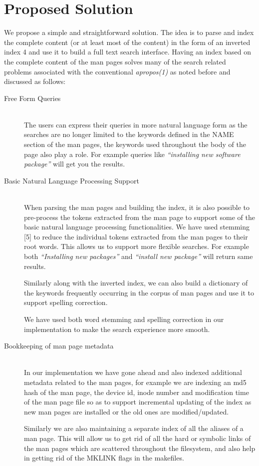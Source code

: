 \documentclass[titlepage, a4paper, 12pt]{article}
\begin{document}
\section{Proposed Solution}
We propose a simple and straightforward solution. The idea is to parse and index
the complete content (or at least most of the content) in the form of an
inverted index {4} and use it to build a full text search
interface. Having an index based on the complete content of the man pages solves
many of the search
related problems associated with the conventional \textit{apropos(1)} as noted
before and discussed as follows:
\begin{description}
\item[Free Form Queries] \hfill \\
The users can express their queries in more natural language form as the searches
are no longer limited to the keywords defined in the NAME section of the man
pages, the keywords used throughout the body of the page also play a role.
For example queries like \textit{``installing new software package''}
will get you the results.
\end{description}
\begin{description}
\item[Basic Natural Language Processing Support] \hfill \\
When parsing the man pages and building the index, it is also possible to
pre-process the tokens extracted from the man page to support some of the
basic natural language processing functionalities. We have used stemming [5] to
reduce the individual tokens extracted from the man pages to their root words.
This allows us to support more flexible searches. For example both
\textit{``Installing new packages''} and \textit{``install new package''} will
return same results.

Similarly along with the inverted index, we can also build a dictionary of the
keywords frequently occurring in the corpus of man pages and use it to support
spelling correction.

We have used both word stemming and spelling correction in our implementation to
make the search experience more smooth.
\end{description}
\begin{description}
\item[Bookkeeping of man page metadata] \hfill \\
In our implementation we have gone ahead and also indexed additional metadata
related to the man pages, for example we are indexing an md5 hash of the man
page, the device id, inode number and modification time of the man page file so
as to support incremental updating of the index as new man pages are installed
or the old ones are modified/updated.

Similarly we are also maintaining a separate index of all the aliases of a man
page. This will allow us to get rid of all the hard or symbolic links of the man
pages which are scattered throughout the filesystem, and also help in getting rid
of the MKLINK flags in the makefiles.
\end{description}
\end{document}
